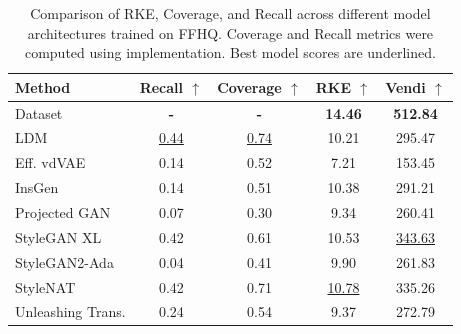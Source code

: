 \documentclass{article}
\theoremstyle{plain}
\theoremstyle{definition}
\renewcommand{\cite}{\citep}
\begin{document}
\begin{appendices}
\begin{table}[ht]
\centering
\caption{Comparison of RKE, Coverage, and Recall across different model architectures trained on FFHQ. Coverage and Recall metrics were computed using \citet{stein_exposing_2023} implementation. Best model scores are underlined.}
\label{tab:ffhq_rke_vs_recall_coverage}
\begin{tabular}{lcccc}
\toprule
Method & Recall $\uparrow$ & Coverage $\uparrow$ & RKE $\uparrow$ & Vendi $\uparrow$\\
\midrule
Dataset & \textbf{-} & \textbf{-} & \textbf{14.46} & \textbf{512.84}\\
\midrule
LDM~\cite{rombach2022ldm}  & \underline{0.44} & \underline{0.74} & 10.21 & 295.47\\
Eff. vdVAE \cite{hazami2022efficientvdvae} & 0.14 & 0.52 & 7.21 & 153.45\\
InsGen \cite{yang2021insgen} & 0.14 & 0.51 & 10.38 & 291.21\\
Projected GAN \cite{sauer2021projected-gan}& 0.07 & 0.30 & 9.34 & 260.41\\
StyleGAN XL \cite{sauer2022styleganxl}& 0.42 & 0.61 & 10.53 & \underline{343.63}\\
StyleGAN2-Ada \cite{karras2020stylegan2ada}& 0.04 & 0.41 & 9.90 & 261.83\\
StyleNAT \cite{walton2022stylenat}& 0.42 & 0.71 & \underline{10.78} & 335.26\\
Unleashing Trans. \cite{bondtaylor2022unleashing}& 0.24 & 0.54 & 9.37 & 272.79\\
\bottomrule
\end{tabular}
\end{table}


\end{appendices}
\end{document}
